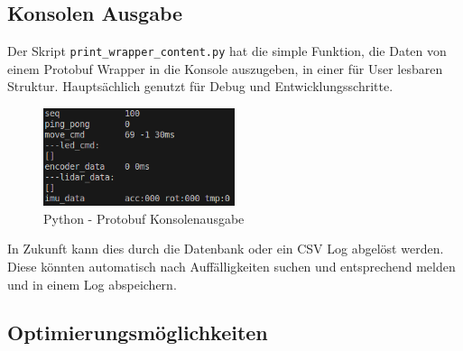 \subsection{Konsolen Ausgabe}
Der Skript \texttt{print\_wrapper\_content.py} hat die simple Funktion, 
die Daten von einem Protobuf Wrapper in die Konsole auszugeben, 
in einer für User lesbaren Struktur. 
Hauptsächlich genutzt für Debug und Entwicklungsschritte.

\begin{figure}[H]
    \includegraphics[width=0.5\textwidth, center]{img/Backend/print_wrapper_all.png}
    \caption{Python - Protobuf Konsolenausgabe}
    \label{fig:py_konsole_o}
\end{figure}

In Zukunft kann dies durch die Datenbank oder ein CSV Log abgelöst werden.
% 
Diese könnten automatisch nach Auffälligkeiten suchen 
und entsprechend melden und in einem Log abspeichern.






\subsection{Optimierungsmöglichkeiten}
\label{subsec:Optimierungsmöglichkeiten}
